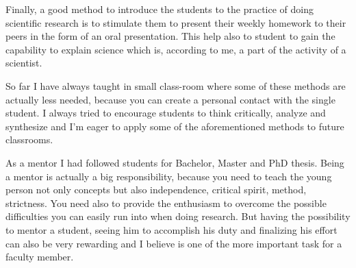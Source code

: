 \documentclass[12pt,a4paper]{article}
\begin{document}
Finally, a good method to introduce the students to the practice of
doing scientific research is to stimulate them to present
their weekly homework to their peers in the form of an oral
presentation. This help also to student to gain the capability to
explain science which is, according to me, a part of the activity
of a scientist. 

So far I have always taught in small class-room where some of these
methods are actually less needed, because you can create a personal
contact with the single student. I always tried to encourage students
to think critically,  analyze and synthesize and I'm eager to apply
some of the aforementioned methods to future classrooms.

As a mentor I had followed students for Bachelor, Master
and PhD thesis. Being a mentor is actually a big
responsibility, because you need to teach the young person not only
concepts but also independence, critical spirit, method,
strictness. 
You need also to provide the enthusiasm to overcome the
possible difficulties you can easily run into when doing research. But
having the possibility to mentor a student, seeing him to accomplish
his duty and finalizing his effort can also be very rewarding and I
believe is one of the more important task for a faculty member. 


\printbibliography[title=References]
\end{document}
